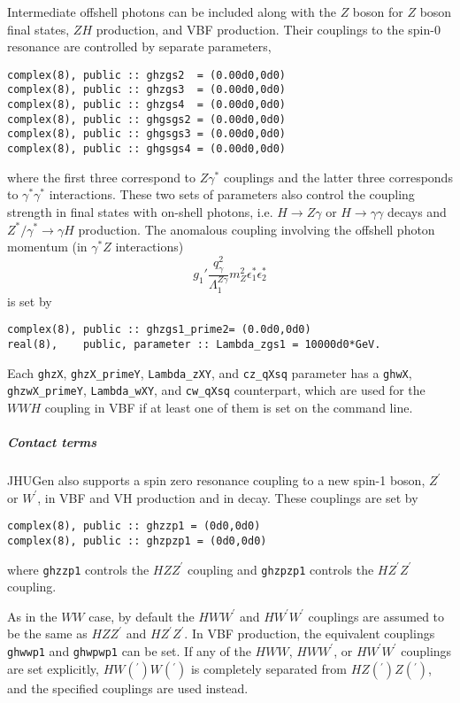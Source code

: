 \documentclass[aps,superscriptaddress,nofootinbib]{revtex4}
\begin{document}
Intermediate offshell photons can be included along with the $Z$ boson for $Z$ boson final states, $ZH$ production, and VBF production.
Their couplings to the spin-0 resonance are controlled by separate parameters,
\begin{verbatim}
complex(8), public :: ghzgs2  = (0.00d0,0d0)
complex(8), public :: ghzgs3  = (0.00d0,0d0)
complex(8), public :: ghzgs4  = (0.00d0,0d0)
complex(8), public :: ghgsgs2 = (0.00d0,0d0)
complex(8), public :: ghgsgs3 = (0.00d0,0d0)
complex(8), public :: ghgsgs4 = (0.00d0,0d0)
\end{verbatim}
where the first three correspond to $Z\gamma^*$ couplings and the latter three corresponds to $\gamma^* \gamma^*$ interactions.
These two sets of parameters also control the coupling strength in final states with on-shell photons, i.e. $H\to Z\gamma$ or $H\to \gamma\gamma$ decays and $Z^*/\gamma^*\to\gamma H$ production.
The anomalous coupling involving the offshell photon momentum (in $\gamma^* Z$ interactions)
\[
g_1' \frac{ q^2_\gamma }{ \Lambda_1^{Z\gamma} } m_Z^2 \epsilon^*_1 \epsilon^*_2
\]
is set by
\begin{verbatim}
complex(8), public :: ghzgs1_prime2= (0.0d0,0d0)
real(8),    public, parameter :: Lambda_zgs1 = 10000d0*GeV.
\end{verbatim}

Each \verb|ghzX|, \verb|ghzX_primeY|, \verb|Lambda_zXY|, and \verb|cz_qXsq| parameter has a \verb|ghwX|, \verb|ghzwX_primeY|, \verb|Lambda_wXY|, and \verb|cw_qXsq| counterpart, which are used for the $WWH$ coupling in VBF if at least one of them is set on the command line.

\subparagraph{Contact terms}
\label{contactterms}

JHUGen also supports a spin zero resonance coupling to a new spin-1 boson, $Z^\prime$ or $W^\prime$, in VBF and VH production and in decay.
These couplings are set by
\begin{verbatim}
complex(8), public :: ghzzp1 = (0d0,0d0)
complex(8), public :: ghzpzp1 = (0d0,0d0)
\end{verbatim}
where \verb|ghzzp1| controls the $HZZ^\prime$ coupling and \verb|ghzpzp1| controls the $HZ^\prime Z^\prime$ coupling.

As in the $WW$ case, by default the $HWW^\prime$ and $HW^\prime W^\prime$ couplings are assumed to be the same as $HZZ^\prime$ and $HZ^\prime Z^\prime$.  In VBF production, the equivalent couplings \verb|ghwwp1| and \verb|ghwpwp1| can be set.  If any of the $HWW$, $HWW^\prime$, or $HW^\prime W^\prime$ couplings are set explicitly, $HW({}^\prime)W(^{\prime})$ is completely separated from $HZ({}^\prime)Z(^{\prime})$, and the specified couplings are used instead.
\end{document}
